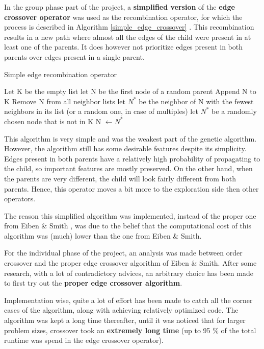 \documentclass[a4paper,10pt]{article}
\begin{document}
In the group phase part of the project, a \textbf{simplified version} of the \textbf{edge crossover operator} was used as the recombination operator, for which the process is described in Algorithm \ref{simple_edge_crossover} \cite{initial_implementation_edge_crossover}. This recombination results in a new path where almost all the edges of the child were present in at least one of the parents. It does however not prioritize edges present in both parents over edges present in a single parent.

\begin{algorithm}
\caption{Simple edge recombination operator \cite{initial_implementation_edge_crossover}}\label{simple_edge_crossover}
\begin{algorithmic}
\State Let K be the empty list
\State let N be the first node of a random parent
\State Append N to K
\State Remove N from all neighbor lists
\State let $N^*$ be the neighbor of N with the fewest neighbors in its list (or a random one, in case of multiples)
\Else 
\State let $N^*$ be a randomly chosen node that is not in K
\EndIf
\State N $\gets N^*$
\EndWhile
\end{algorithmic}
\end{algorithm}

This algorithm is very simple and was the weakest part of the genetic algorithm. However, the algorithm still has some desirable features despite its simplicity. Edges present in both parents have a relatively high probability of propagating to the child, so important features are mostly preserved. On the other hand,
when the parents are very different, the child will look fairly different from both parents. Hence, this operator moves a bit more to the exploration side then other operators.

The reason this simplified algorithm was implemented, instead of the proper one from Eiben \& Smith \cite{eiben_smith}, was due to the belief that the computational cost of this algorithm was (much) lower than the one from Eiben \& Smith. 

For the individual phase of the project, an analysis was made between order crossover and the proper edge crossover algorithm of Eiben \& Smith. After some research, with a lot of contradictory advices, an arbitrary choice has been made to first try out the \textbf{proper edge crossover algorithm}.

Implementation wise, quite a lot of effort has been made to catch all the corner cases of the algorithm, along with achieving relatively optimized code. The algorithm was kept a long time thereafter, until it was noticed that for larger problem sizes, crossover took an \textbf{extremely long time} (up to 95 \% of the total runtime was spend in the edge crossover operator).
\end{document}
